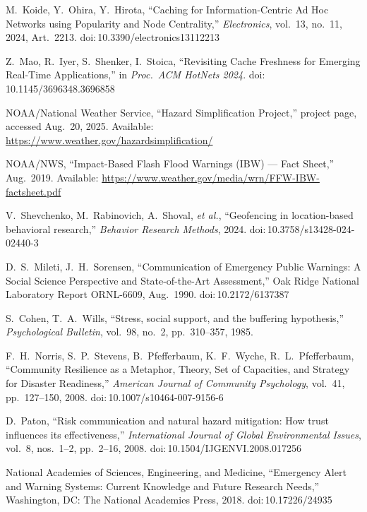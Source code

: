 \documentclass[11pt,twocolumn]{article}
\begin{document}
\begin{thebibliography}{99}
M.\ Koide, Y.\ Ohira, Y.\ Hirota, ``Caching for Information-Centric Ad Hoc Networks using Popularity and Node Centrality,'' \emph{Electronics}, vol.\ 13, no.\ 11, 2024, Art.\ 2213. doi:\,10.3390/electronics13112213

Z.\ Mao, R.\ Iyer, S.\ Shenker, I.\ Stoica, ``Revisiting Cache Freshness for Emerging Real-Time Applications,'' in \emph{Proc.\ ACM HotNets 2024}. doi:\,10.1145/3696348.3696858

NOAA/National Weather Service, ``Hazard Simplification Project,'' project page, accessed Aug.\ 20, 2025. Available: \url{https://www.weather.gov/hazardsimplification/}

NOAA/NWS, ``Impact-Based Flash Flood Warnings (IBW) — Fact Sheet,'' Aug.\ 2019. Available: \url{https://www.weather.gov/media/wrn/FFW-IBW-factsheet.pdf}

V.\ Shevchenko, M.\ Rabinovich, A.\ Shoval, \emph{et al.}, ``Geofencing in location-based behavioral research,'' \emph{Behavior Research Methods}, 2024. doi:\,10.3758/s13428-024-02440-3

D.\ S.\ Mileti, J.\ H.\ Sorensen, ``Communication of Emergency Public Warnings: A Social Science Perspective and State-of-the-Art Assessment,'' Oak Ridge National Laboratory Report ORNL-6609, Aug.\ 1990. doi:\,10.2172/6137387

S.\ Cohen, T.\ A.\ Wills, ``Stress, social support, and the buffering hypothesis,'' \emph{Psychological Bulletin}, vol.\ 98, no.\ 2, pp.\ 310--357, 1985.

F.\ H.\ Norris, S.\ P.\ Stevens, B.\ Pfefferbaum, K.\ F.\ Wyche, R.\ L.\ Pfefferbaum, ``Community Resilience as a Metaphor, Theory, Set of Capacities, and Strategy for Disaster Readiness,'' \emph{American Journal of Community Psychology}, vol.\ 41, pp.\ 127--150, 2008. doi:\,10.1007/s10464-007-9156-6

D.\ Paton, ``Risk communication and natural hazard mitigation: How trust influences its effectiveness,'' \emph{International Journal of Global Environmental Issues}, vol.\ 8, nos.\ 1--2, pp.\ 2--16, 2008. doi:\,10.1504/IJGENVI.2008.017256

National Academies of Sciences, Engineering, and Medicine, ``Emergency Alert and Warning Systems: Current Knowledge and Future Research Needs,'' Washington, DC: The National Academies Press, 2018. doi:\,10.17226/24935


\end{thebibliography}
\end{document}
